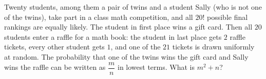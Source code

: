 Twenty students, among them a pair of twins and a student Sally (who is not one of the twins), take part in a class math competition, and all $20!$ possible final rankings are equally likely. The student in first place wins a gift card. Then all $20$ students enter a raffle for a math book: the student in last place gets $2$ raffle tickets, every other student gets $1$, and one of the $21$ tickets is drawn uniformly at random. The probability that one of the twins wins the gift card and Sally wins the raffle can be written as $\dfrac mn$ in lowest terms. What is $m^2+n$?

